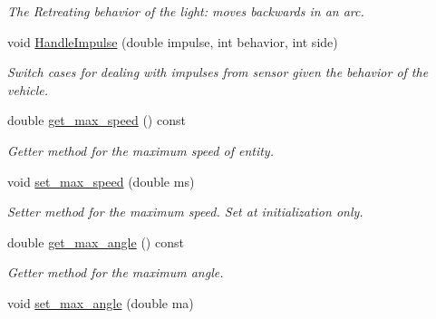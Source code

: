 \begin{DoxyCompactItemize}
\begin{DoxyCompactList}\small\item\em The Retreating behavior of the light\+: moves backwards in an arc. \end{DoxyCompactList}\item 
void \hyperlink{classMotionHandler_ae919b4594fd801be64ca81dc4889ada4}{Handle\+Impulse} (double impulse, int behavior, int side)\hypertarget{classMotionHandler_ae919b4594fd801be64ca81dc4889ada4}{}\label{classMotionHandler_ae919b4594fd801be64ca81dc4889ada4}

\begin{DoxyCompactList}\small\item\em Switch cases for dealing with impulses from sensor given the behavior of the vehicle. \end{DoxyCompactList}\item 
double \hyperlink{classMotionHandler_a4024f3b5562b5e49bfaeab9f82c0762b}{get\+\_\+max\+\_\+speed} () const \hypertarget{classMotionHandler_a4024f3b5562b5e49bfaeab9f82c0762b}{}\label{classMotionHandler_a4024f3b5562b5e49bfaeab9f82c0762b}

\begin{DoxyCompactList}\small\item\em Getter method for the maximum speed of entity. \end{DoxyCompactList}\item 
void \hyperlink{classMotionHandler_a32e832d35e73e9db85c16b3ff569196e}{set\+\_\+max\+\_\+speed} (double ms)\hypertarget{classMotionHandler_a32e832d35e73e9db85c16b3ff569196e}{}\label{classMotionHandler_a32e832d35e73e9db85c16b3ff569196e}

\begin{DoxyCompactList}\small\item\em Setter method for the maximum speed. Set at initialization only. \end{DoxyCompactList}\item 
double \hyperlink{classMotionHandler_a55eb7aeb355b6ee86b2bd8751fde6cb5}{get\+\_\+max\+\_\+angle} () const \hypertarget{classMotionHandler_a55eb7aeb355b6ee86b2bd8751fde6cb5}{}\label{classMotionHandler_a55eb7aeb355b6ee86b2bd8751fde6cb5}

\begin{DoxyCompactList}\small\item\em Getter method for the maximum angle. \end{DoxyCompactList}\item 
void \hyperlink{classMotionHandler_aa73973c705626f1f95ac59391f23bcc9}{set\+\_\+max\+\_\+angle} (double ma)\hypertarget{classMotionHandler_aa73973c705626f1f95ac59391f23bcc9}{}\label{classMotionHandler_aa73973c705626f1f95ac59391f23bcc9}


\end{DoxyCompactItemize}
